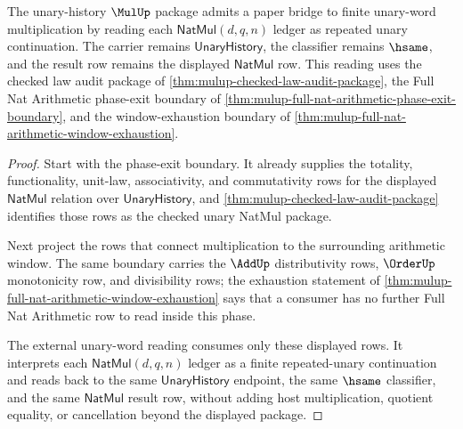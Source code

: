\begin{theorem}
\label{thm:mulup-unary-standard-bridge-boundary}
The unary-history $\MulUp$ package admits a paper bridge to finite unary-word
multiplication by reading each $\mathsf{NatMul}(d,q,n)$ ledger as repeated unary
continuation. The carrier remains $\mathsf{UnaryHistory}$, the classifier remains
$\hsame$, and the result row remains the displayed $\mathsf{NatMul}$ row. This
reading uses the checked law audit package of
\autoref{thm:mulup-checked-law-audit-package}, the Full Nat Arithmetic phase-exit
boundary of \autoref{thm:mulup-full-nat-arithmetic-phase-exit-boundary}, and the
window-exhaustion boundary of
\autoref{thm:mulup-full-nat-arithmetic-window-exhaustion}.
\end{theorem}
\begin{proof}
Start with the phase-exit boundary. It already supplies the totality,
functionality, unit-law, associativity, and commutativity rows for the displayed
$\mathsf{NatMul}$ relation over $\mathsf{UnaryHistory}$, and
\autoref{thm:mulup-checked-law-audit-package} identifies those rows as the
checked unary NatMul package.

Next project the rows that connect multiplication to the surrounding arithmetic
window. The same boundary carries the $\AddUp$ distributivity rows,
$\OrderUp$ monotonicity row, and divisibility rows; the exhaustion statement of
\autoref{thm:mulup-full-nat-arithmetic-window-exhaustion} says that a consumer
has no further Full Nat Arithmetic row to read inside this phase.

The external unary-word reading consumes only these displayed rows. It interprets
each $\mathsf{NatMul}(d,q,n)$ ledger as a finite repeated-unary continuation and
reads back to the same $\mathsf{UnaryHistory}$ endpoint, the same $\hsame$
classifier, and the same $\mathsf{NatMul}$ result row, without adding host
multiplication, quotient equality, or cancellation beyond the displayed package.
\end{proof}

